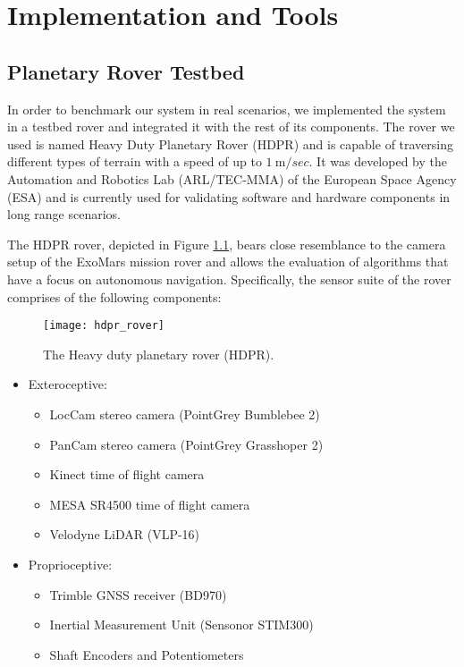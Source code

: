 \label{Chapter3}

\chapter{Implementation and Tools}

\section{Planetary Rover Testbed} \label{hdpr_rover}

In order to benchmark our system in real scenarios, we implemented the
system in a testbed rover and integrated it with the rest of its components.
The rover we used is named Heavy Duty Planetary Rover (HDPR) and is
capable of traversing different types of terrain with a speed of up to
$\SI{1}{\m \per sec}$.
It was developed by the Automation and Robotics Lab (ARL/TEC-MMA) of the
European Space Agency (ESA) and is currently used for validating
software and hardware components in long range scenarios.

The HDPR rover, depicted in Figure \ref{fig:hdpr_rover}, bears close
resemblance to the camera setup of the ExoMars mission rover and allows the
evaluation of algorithms that have a focus on autonomous navigation.
Specifically, the sensor suite of the rover comprises of the following
components:

\begin{figure}[h!]
    \centering
    \texttt{[image: hdpr\_rover]}
    \decoRule
    \caption[Heavy duty planetary rover]{
        The Heavy duty planetary rover (HDPR).
    }
    \label{fig:hdpr_rover}
\end{figure}

\begin{itemize}
    \item Exteroceptive:
        \begin{itemize}
            \item LocCam stereo camera (PointGrey Bumblebee 2)
            \item PanCam stereo camera (PointGrey Grasshoper 2)
            \item Kinect time of flight camera
            \item MESA SR4500 time of flight camera
            \item Velodyne LiDAR (VLP-16)
        \end{itemize}
    \item Proprioceptive:
        \begin{itemize}
            \item Trimble GNSS receiver (BD970)
            \item Inertial Measurement Unit (Sensonor STIM300)
            \item Shaft Encoders and Potentiometers
        \end{itemize}
\end{itemize}


